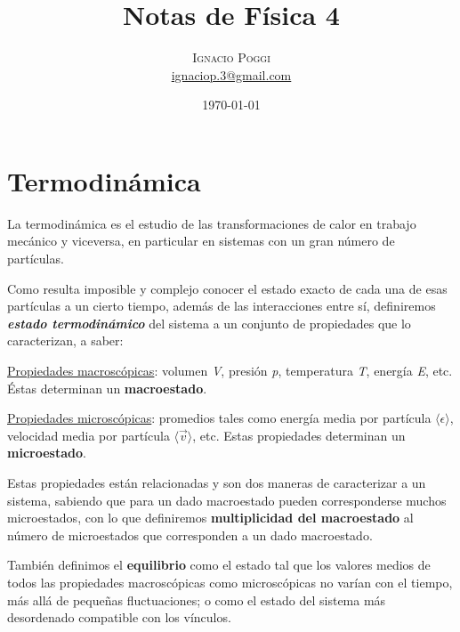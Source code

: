 \documentclass[a4paper]{article}
\title{Notas de F\'isica 4} %
\author{%
\textsc{Ignacio Poggi} \\[1ex] %
\normalsize \href{mailto:ignaciop.3@gmail.com}{ignaciop.3@gmail.com} %
}
\date{\today} %
\begin{document}
\maketitle



\section{Termodin\'amica}

La termodin\'amica es el estudio de las transformaciones de calor en trabajo mec\'anico y viceversa, en particular en sistemas con un gran n\'umero de part\'iculas.\newline

Como resulta imposible y complejo conocer el estado exacto de cada una de esas part\'iculas a un cierto tiempo, adem\'as de las interacciones entre s\'i, definiremos \textbf{\textit{estado termodin\'amico}} del sistema a un conjunto de propiedades que lo caracterizan, a saber:\newline

\underline{Propiedades macrosc\'opicas}: volumen \textit{V}, presi\'on \textit{p}, temperatura \textit{T}, energ\'ia \textit{E}, etc. \'Estas determinan un \textbf{macroestado}.\newline

\underline{Propiedades microsc\'opicas}: promedios tales como energ\'ia media por part\'icula $\langle \epsilon \rangle$, velocidad media por part\'icula $\langle \vec{v} \rangle$, etc. Estas propiedades determinan un \textbf{microestado}.\newline

Estas propiedades est\'an relacionadas y son dos maneras de caracterizar a un sistema, sabiendo que para un dado macroestado pueden corresponderse muchos microestados, con lo que definiremos \textbf{multiplicidad del macroestado} al n\'umero de microestados que corresponden a un dado macroestado.\newline

Tambi\'en definimos el \textbf{equilibrio} como el estado tal que los valores medios de todos las propiedades macrosc\'opicas como microsc\'opicas no var\'ian con el tiempo, m\'as all\'a de peque\~nas fluctuaciones; o como el estado del sistema m\'as desordenado compatible con los v\'inculos.\newline
\end{document}
